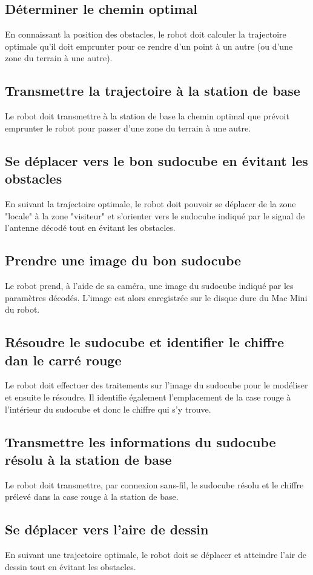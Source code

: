 \subsection{Déterminer le chemin optimal}
En connaissant la position des obstacles, le robot doit calculer la trajectoire optimale qu'il doit emprunter pour ce rendre d'un point à un autre (ou d'une zone du terrain à une autre).
\subsection{Transmettre la trajectoire à la station de base}
Le robot doit transmettre à la station de base la chemin optimal que prévoit emprunter le robot pour passer d'une zone du terrain à une autre.
\subsection{Se déplacer vers le bon sudocube en évitant les obstacles}
En suivant la trajectoire optimale, le robot doit pouvoir se déplacer de la zone "locale" à la zone "visiteur" et s'orienter vers le sudocube indiqué par le signal de l'antenne décodé tout en évitant les obstacles.
\subsection{Prendre une image du bon sudocube}
Le robot prend, à l'aide de sa caméra, une image du sudocube indiqué par les paramètres décodés. L'image est alors enregistrée sur le disque dure du Mac Mini du robot.
\subsection{Résoudre le sudocube et identifier le chiffre dan le carré rouge}
Le robot doit effectuer des traitements sur l'image du sudocube pour le modéliser et ensuite le résoudre. Il identifie également l'emplacement de la case rouge à l'intérieur du sudocube et donc le chiffre qui s'y trouve.
\subsection{Transmettre les informations du sudocube résolu à la station de base}
Le robot doit transmettre, par connexion sans-fil, le sudocube résolu et le chiffre prélevé dans la case rouge à la station de base.
\subsection{Se déplacer vers l'aire de dessin}
En suivant une trajectoire optimale, le robot doit se déplacer et atteindre l'air de dessin tout en évitant les obstacles.
